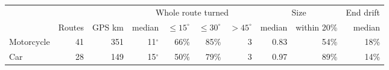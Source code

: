 \begin{tabular}{lrrrrrrrrr}
\toprule
 & & & \multicolumn{4}{c}{Whole route turned} & \multicolumn{2}{c}{Size} & End drift\\
\cmidrule(lr){4-7}\cmidrule(lr){8-9}\cmidrule(lr){10-10}
 & Routes & GPS km & median & $\le 15^\circ$ & $\le 30^\circ$ & $> 45^\circ$ & median & within 20\% & median\\
\midrule
Motorcycle & 41 & 351 & 11$^\circ$ & 66\% & 85\% & 3 & 0.83 & 54\% & 18\% \\
Car & 28 & 149 & 15$^\circ$ & 50\% & 79\% & 3 & 0.97 & 89\% & 14\% \\
\bottomrule
\end{tabular}
